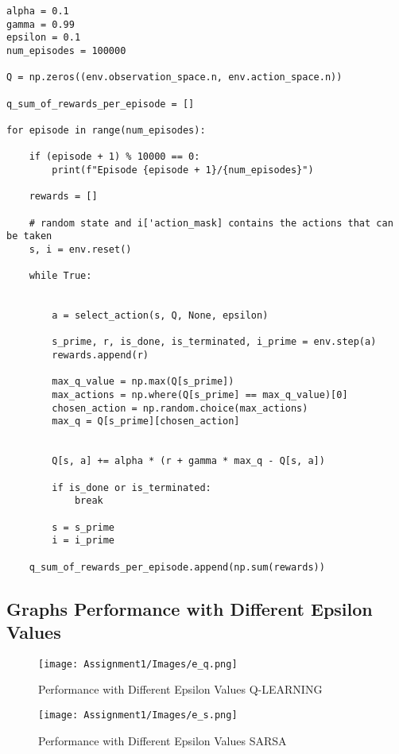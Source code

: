\documentclass[11pt,a4paper]{article}
\begin{document}
\begin{lstlisting}
alpha = 0.1
gamma = 0.99
epsilon = 0.1
num_episodes = 100000

Q = np.zeros((env.observation_space.n, env.action_space.n))

q_sum_of_rewards_per_episode = []

for episode in range(num_episodes):

    if (episode + 1) % 10000 == 0:
        print(f"Episode {episode + 1}/{num_episodes}")

    rewards = []

    # random state and i['action_mask] contains the actions that can be taken
    s, i = env.reset()

    while True:


        a = select_action(s, Q, None, epsilon)

        s_prime, r, is_done, is_terminated, i_prime = env.step(a)
        rewards.append(r)

        max_q_value = np.max(Q[s_prime])
        max_actions = np.where(Q[s_prime] == max_q_value)[0]
        chosen_action = np.random.choice(max_actions)
        max_q = Q[s_prime][chosen_action]


        Q[s, a] += alpha * (r + gamma * max_q - Q[s, a])

        if is_done or is_terminated:
            break

        s = s_prime
        i = i_prime
    
    q_sum_of_rewards_per_episode.append(np.sum(rewards))
\end{lstlisting}

\pagebreak

\subsection{Graphs Performance with Different Epsilon Values}

\begin{figure}[h!]
    \centering
    \texttt{[image: Assignment1/Images/e\_q.png]}
    \caption{Performance with Different Epsilon Values Q-LEARNING}
    \label{fig:yourlabel}
\end{figure}

\begin{figure}[h!]
    \centering
    \texttt{[image: Assignment1/Images/e\_s.png]}
    \caption{Performance with Different Epsilon Values SARSA}
    \label{fig:yourlabel}
\end{figure}
\end{document}
